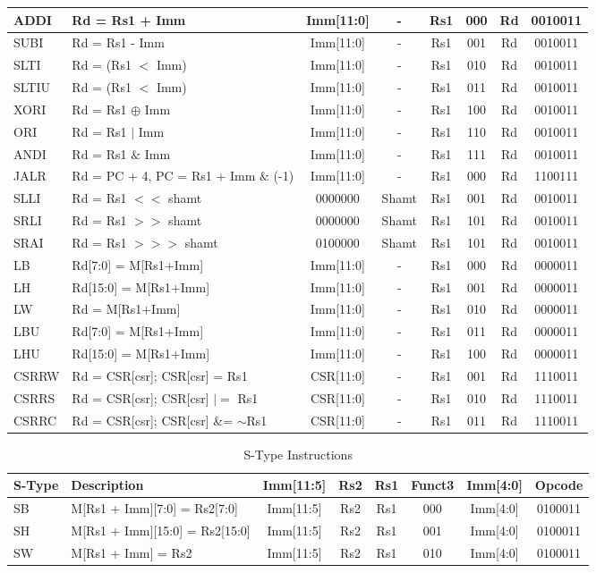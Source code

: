\documentclass[12pt,a4paper]{report}
\begin{document}
\begin{longtable}{|l|p{6cm}|c|c|c|c|c|c|}
ADDI & Rd = Rs1 + Imm & Imm[11:0] & - & Rs1 & 000 & Rd & 0010011 \\
\hline
SUBI & Rd = Rs1 - Imm & Imm[11:0] & - & Rs1 & 001 & Rd & 0010011 \\
\hline
SLTI & Rd = (Rs1 $<$ Imm) & Imm[11:0] & - & Rs1 & 010 & Rd & 0010011 \\
\hline
SLTIU & Rd = (Rs1 $<$ Imm) & Imm[11:0] & - & Rs1 & 011 & Rd & 0010011 \\
\hline
XORI & Rd = Rs1 $\oplus$ Imm & Imm[11:0] & - & Rs1 & 100 & Rd & 0010011 \\
\hline
ORI & Rd = Rs1 $|$ Imm & Imm[11:0] & - & Rs1 & 110 & Rd & 0010011 \\
\hline
ANDI & Rd = Rs1 $\&$ Imm & Imm[11:0] & - & Rs1 & 111 & Rd & 0010011 \\
\hline
JALR & Rd = PC + 4, PC = Rs1 + Imm $\&$ (-1) & Imm[11:0] & - & Rs1 & 000 & Rd & 1100111 \\
\hline
SLLI & Rd = Rs1 $<<$ shamt & 0000000 & Shamt & Rs1 & 001 & Rd & 0010011 \\
\hline
SRLI & Rd = Rs1 $>>$ shamt & 0000000 & Shamt & Rs1 & 101 & Rd & 0010011 \\
\hline
SRAI & Rd = Rs1 $>>>$ shamt & 0100000 & Shamt & Rs1 & 101 & Rd & 0010011 \\
\hline
LB & Rd[7:0] = M[Rs1+Imm] & Imm[11:0] & - & Rs1 & 000 & Rd & 0000011 \\
\hline
LH & Rd[15:0] = M[Rs1+Imm] & Imm[11:0] & - & Rs1 & 001 & Rd & 0000011 \\
\hline
LW & Rd = M[Rs1+Imm] & Imm[11:0] & - & Rs1 & 010 & Rd & 0000011 \\
\hline
LBU & Rd[7:0] = M[Rs1+Imm] & Imm[11:0] & - & Rs1 & 011 & Rd & 0000011 \\
\hline
LHU & Rd[15:0] = M[Rs1+Imm] & Imm[11:0] & - & Rs1 & 100 & Rd & 0000011 \\
\hline
CSRRW & Rd = CSR[csr]; CSR[csr] = Rs1 & CSR[11:0] & - & Rs1 & 001 & Rd & 1110011 \\
\hline
CSRRS & Rd = CSR[csr]; CSR[csr] $|=$ Rs1 & CSR[11:0] & - & Rs1 & 010 & Rd & 1110011 \\
\hline
CSRRC & Rd = CSR[csr]; CSR[csr] \&= $\sim$Rs1 & CSR[11:0] & - & Rs1 & 011 & Rd & 1110011 \\
\hline
\end{longtable}

\begin{longtable}{|l|p{6cm}|c|c|c|c|c|c|}
\caption{S-Type Instructions} \\
\hline
\textbf{S-Type} & \textbf{Description} & \textbf{Imm[11:5]} & \textbf{Rs2} & \textbf{Rs1} & \textbf{Funct3} & \textbf{Imm[4:0]} & \textbf{Opcode} \\
\hline
\endfirsthead
\hline
\endlastfoot

SB & M[Rs1 + Imm][7:0] = Rs2[7:0] & Imm[11:5] & Rs2 & Rs1 & 000 & Imm[4:0] & 0100011 \\
\hline
SH & M[Rs1 + Imm][15:0] = Rs2[15:0] & Imm[11:5] & Rs2 & Rs1 & 001 & Imm[4:0] & 0100011 \\
\hline
SW & M[Rs1 + Imm] = Rs2 & Imm[11:5] & Rs2 & Rs1 & 010 & Imm[4:0] & 0100011 \\
\hline
\end{longtable}
\end{document}
